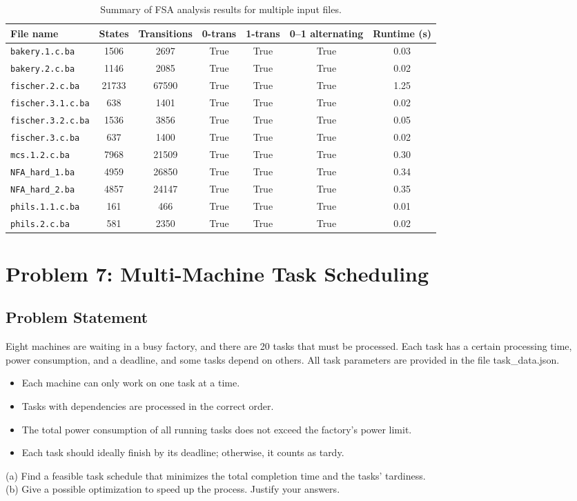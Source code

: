\documentclass{article}
\begin{document}
\begin{table}[htbp]
\centering
\begin{tabular}{l|c|c|c|c|c|c}
\textbf{File name} & \textbf{States} & \textbf{Transitions} &
\textbf{0-trans} & \textbf{1-trans} &
\textbf{0–1 alternating} & \textbf{Runtime (s)} \\\hline
\texttt{bakery.1.c.ba} & 1506 & 2697 & True & True & True & 0.03 \\
\texttt{bakery.2.c.ba} & 1146 & 2085 & True & True & True & 0.02 \\
\texttt{fischer.2.c.ba} & 21733 & 67590 & True & True & True & 1.25 \\
\texttt{fischer.3.1.c.ba} & 638 & 1401 & True & True & True & 0.02 \\
\texttt{fischer.3.2.c.ba} & 1536 & 3856 & True & True & True & 0.05 \\
\texttt{fischer.3.c.ba} & 637 & 1400 & True & True & True & 0.02 \\
\texttt{mcs.1.2.c.ba} & 7968 & 21509 & True & True & True & 0.30 \\
\texttt{NFA\_hard\_1.ba} & 4959 & 26850 & True & True & True & 0.34 \\
\texttt{NFA\_hard\_2.ba} & 4857 & 24147 & True & True & True & 0.35 \\
\texttt{phils.1.1.c.ba} & 161 & 466 & True & True & True & 0.01 \\
\texttt{phils.2.c.ba} & 581 & 2350 & True & True & True & 0.02 \\
\end{tabular}
\caption{Summary of FSA analysis results for multiple input files.}
\end{table}


\section*{Problem 7: Multi-Machine Task Scheduling}
\setcounter{section}{0}
\subsection*{Problem Statement}
Eight machines are waiting in a busy factory, and there are 20 tasks that must be processed. Each task has a certain processing time, power consumption, and a deadline, and some tasks depend on others. All task parameters are provided in the file task\_data.json.
\begin{itemize}
  \item Each machine can only work on one task at a time.
  \item Tasks with dependencies are processed in the correct order.
  \item The total power consumption of all running tasks does not exceed the factory’s power limit.
  \item Each task should ideally finish by its deadline; otherwise, it counts as tardy.
\end{itemize}
(a) Find a feasible task schedule that minimizes the total completion time and the tasks' tardiness.
\\(b) Give a possible optimization to speed up the process. Justify your answers.
\end{document}

